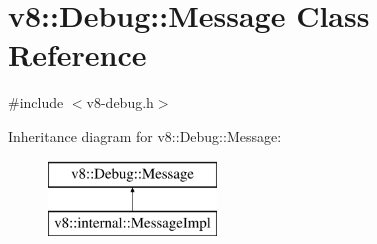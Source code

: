 \hypertarget{classv8_1_1_debug_1_1_message}{}\section{v8\+:\+:Debug\+:\+:Message Class Reference}
\label{classv8_1_1_debug_1_1_message}


{\ttfamily \#include $<$v8-\/debug.\+h$>$}

Inheritance diagram for v8\+:\+:Debug\+:\+:Message\+:\begin{figure}[H]
\begin{center}
\leavevmode
\includegraphics[height=2.000000cm]{classv8_1_1_debug_1_1_message}
\end{center}
\end{figure}

